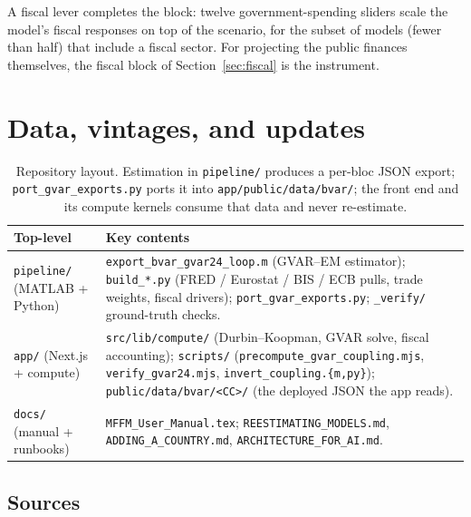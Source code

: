 \documentclass[11pt]{article}
\theoremstyle{plain}
\theoremstyle{remark}
\begin{document}
A fiscal lever completes the block: twelve government-spending sliders
scale the model's fiscal responses on top of the scenario, for the
subset of models (fewer than half) that include a fiscal sector. For
projecting the public finances themselves, the fiscal block of
Section~\ref{sec:fiscal} is the instrument.

\section{Data, vintages, and updates}\label{sec:data}

\begin{table}[!ht]
\centering
\footnotesize
\caption{Repository layout. Estimation in \texttt{pipeline/} produces a
per-bloc JSON export; \texttt{port\_gvar\_exports.py} ports it into
\texttt{app/public/data/bvar/}; the front end and its compute kernels consume
that data and never re-estimate.}
\label{tab:repro:layout}
\begin{tabular}{@{}lp{8.6cm}@{}}
\toprule
\textbf{Top-level} & \textbf{Key contents} \\
\midrule
\texttt{pipeline/} (MATLAB + Python) &
  \texttt{export\_bvar\_gvar24\_loop.m} (GVAR--EM estimator);
  \texttt{build\_*.py} (FRED / Eurostat / BIS / ECB pulls, trade weights,
  fiscal drivers); \texttt{port\_gvar\_exports.py}; \texttt{\_verify/}
  ground-truth checks. \\
\addlinespace
\texttt{app/} (Next.js + compute) &
  \texttt{src/lib/compute/} (Durbin--Koopman, GVAR solve, fiscal accounting);
  \texttt{scripts/} (\texttt{precompute\_gvar\_coupling.mjs},
  \texttt{verify\_gvar24.mjs}, \texttt{invert\_coupling.\{m,py\}});
  \texttt{public/data/bvar/<CC>/} (the deployed JSON the app reads). \\
\addlinespace
\texttt{docs/} (manual + runbooks) &
  \texttt{MFFM\_User\_Manual.tex}; \texttt{REESTIMATING\_MODELS.md},
  \texttt{ADDING\_A\_COUNTRY.md}, \texttt{ARCHITECTURE\_FOR\_AI.md}. \\
\bottomrule
\end{tabular}
\end{table}

\subsection{Sources}\label{sec:sources}
\end{document}
